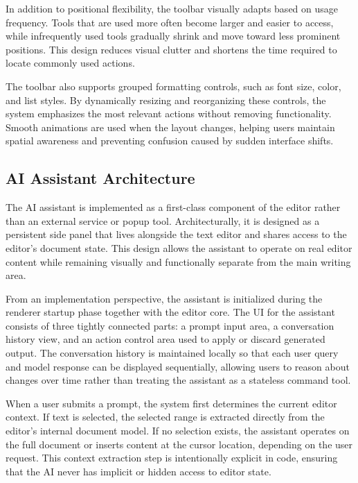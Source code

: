 \documentclass[sigconf]{acmart}
\begin{document}
In addition to positional flexibility, the toolbar visually adapts based on usage frequency. Tools that are used more often become larger and easier to access, while infrequently used tools gradually shrink and move toward less prominent positions. This design reduces visual clutter and shortens the time required to locate commonly used actions.

The toolbar also supports grouped formatting controls, such as font size, color, and list styles. By dynamically resizing and reorganizing these controls, the system emphasizes the most relevant actions without removing functionality. Smooth animations are used when the layout changes, helping users maintain spatial awareness and preventing confusion caused by sudden interface shifts.



\subsection{AI Assistant Architecture}
The AI assistant is implemented as a first-class component of the editor rather than an external service or popup tool. Architecturally, it is designed as a persistent side panel that lives alongside the text editor and shares access to the editor’s document state. This design allows the assistant to operate on real editor content while remaining visually and functionally separate from the main writing area.

From an implementation perspective, the assistant is initialized during the renderer startup phase together with the editor core. The UI for the assistant consists of three tightly connected parts: a prompt input area, a conversation history view, and an action control area used to apply or discard generated output. The conversation history is maintained locally so that each user query and model response can be displayed sequentially, allowing users to reason about changes over time rather than treating the assistant as a stateless command tool.

When a user submits a prompt, the system first determines the current editor context. If text is selected, the selected range is extracted directly from the editor’s internal document model. If no selection exists, the assistant operates on the full document or inserts content at the cursor location, depending on the user request. This context extraction step is intentionally explicit in code, ensuring that the AI never has implicit or hidden access to editor state.
\end{document}
